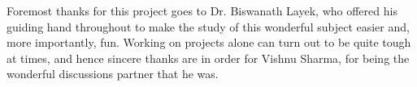 \documentclass[11pt, a4paper, oneside]{Thesis} %
\title{\ttitle} %
\begin{document}
\frontmatter %


\fancyhead{} %
\rhead{\thepage} %
\lhead{} %

\pagestyle{fancy} %


\maketitle
	
\begin{abstract}
 
\end{abstract}

\begin{acknowledgements}
Foremost thanks for this project goes to Dr. Biswanath Layek, who offered his guiding hand throughout to make the study of this wonderful subject easier and, more importantly, fun. Working on projects alone can turn out to be quite tough at times, and hence sincere thanks are in order for Vishnu Sharma, for being the wonderful discussions partner that he was. 
\end{acknowledgements}


\pagestyle{fancy}

	\tableofcontents %

\end{document}

